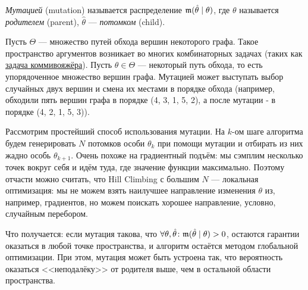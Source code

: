 \newcommand{\mut}{\mathfrak{m}}
\newcommand{\Mut}{\mathfrak{M}}
\begin{definition}
\emph{Мутацией} (mutation) называется распределение $\mut(\hat{\theta} \HM\mid \theta)$, где $\theta$ называется \emph{родителем} (parent), $\hat{\theta}$ --- \emph{потомком} (child).
\end{definition}

\begin{exampleBox}[label=ex:graph_mutation]{}
Пусть $\Theta$ --- множество путей обхода вершин некоторого графа. Такое пространство аргументов возникает во многих комбинаторных задачах (таких как \href{https://ru.wikipedia.org/wiki/Задача_коммивояжёра}{задача коммивояжёра}). Пусть $\theta \in \Theta$ --- некоторый путь обхода, то есть упорядоченное множество вершин графа. Мутацией может выступать выбор случайных двух вершин и смена их местами в порядке обхода (например, обходили пять вершин графа в порядке (4, 3, 1, 5, 2), а после мутации - в порядке (4, 2, 1, 5, 3)). 
\end{exampleBox}

Рассмотрим простейший способ использования мутации. На $k$-ом шаге алгоритма будем генерировать $N$ потомков особи $\theta_k$ при помощи мутации и отбирать из них жадно особь $\theta_{k+1}$. Очень похоже на градиентный подъём: мы сэмплим несколько точек вокруг себя и идём туда, где значение функции максимально. Поэтому отчасти можно считать, что Hill Climbing с большим $N$ --- локальная оптимизация: мы не можем взять наилучшее направление изменения $\theta$ из, например, градиентов, но можем поискать хорошее направление, условно, случайным перебором.

\begin{example}
\begin{center}
\end{center}
\end{example}

Что получается: если мутация такова, что $\forall \theta, \hat{\theta} \colon \mut(\hat{\theta} \HM\mid \theta) \HM> 0$, остаются гарантии оказаться в любой точке пространства, и алгоритм остаётся методом глобальной оптимизации. При этом, мутация может быть устроена так, что вероятность оказаться <<неподалёку>> от родителя выше, чем в остальной области пространства. 

